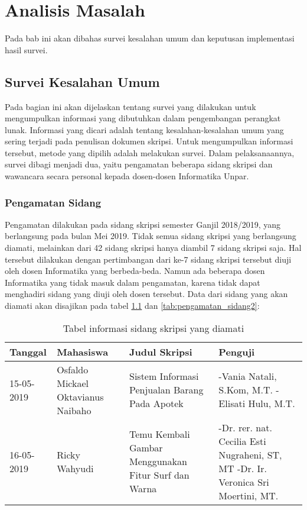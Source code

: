 \chapter{Analisis Masalah}
\label{chap:analisis}

Pada bab ini akan dibahas survei kesalahan umum dan keputusan implementasi hasil survei.

\section{Survei Kesalahan Umum}
\label{sec:survei}

Pada bagian ini akan dijelaskan tentang survei yang dilakukan untuk mengumpulkan informasi yang dibutuhkan dalam pengembangan perangkat lunak. Informasi yang dicari adalah tentang kesalahan-kesalahan umum yang sering terjadi pada penulisan dokumen skripsi. Untuk mengumpulkan informasi tersebut, metode yang dipilih adalah melakukan survei. Dalam pelaksanaannya, survei dibagi menjadi dua, yaitu pengamatan beberapa sidang skripsi dan wawancara secara personal kepada dosen-dosen Informatika Unpar. 

\subsection{Pengamatan Sidang}
Pengamatan dilakukan pada sidang skripsi semester Ganjil 2018/2019, yang berlangsung pada bulan Mei 2019. Tidak semua sidang skripsi yang berlangsung diamati, melainkan dari 42 sidang skripsi hanya diambil 7 sidang skripsi saja. Hal tersebut dilakukan dengan pertimbangan dari ke-7 sidang skripsi tersebut diuji oleh dosen Informatika yang berbeda-beda. Namun ada beberapa dosen Informatika yang tidak masuk dalam pengamatan, karena tidak dapat menghadiri sidang yang diuji oleh dosen tersebut. Data dari sidang yang akan diamati akan disajikan pada tabel \ref{tab:pengamatan_sidang1} dan \ref{tab:pengamatan_sidang2}:

\begin{table}[H]
	\renewcommand{\arraystretch}{1.5}
	\caption {Tabel informasi sidang skripsi yang diamati} 	
	\label{tab:pengamatan_sidang1}
	\begin{center}
		\begin{tabular}{|p{2 cm}|>{\raggedright} p{3.5 cm}| p{4.5 cm}| p{4.5 cm}|}
		\hline
		Tanggal & Mahasiswa & Judul Skripsi & Penguji \\ 
		\hline
		15-05-2019 & Osfaldo Mickael Oktavianus Naibaho & Sistem Informasi Penjualan Barang Pada Apotek & -Vania Natali, S.Kom, M.T. \newline -Elisati Hulu, M.T. \newline \\ 
		\hline
		16-05-2019 & Ricky Wahyudi & Temu Kembali Gambar Menggunakan Fitur Surf dan Warna & -Dr. rer. nat. Cecilia Esti Nugraheni, ST, MT \newline -Dr. Ir. Veronica Sri Moertini, MT. \newline \\ 
		\hline 
		\end{tabular}
	\end{center}
\end{table}


